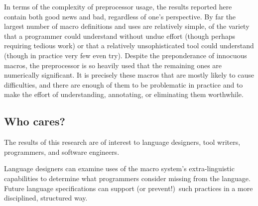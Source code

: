 \documentclass[11pt]{article}
\begin{document}
In terms of the complexity of preprocessor usage, the results reported here
contain both good news and bad, regardless of one's perspective.  By far
the largest number of macro definitions and uses are relatively simple, of
the variety that a programmer could understand without undue effort (though
perhaps requiring tedious work) or that a relatively unsophisticated tool
could understand (though in practice very few even try).  Despite the
preponderance of innocuous macros, the preprocessor is so heavily used that
the remaining ones are numerically significant.  It is precisely these
macros that are mostly likely to cause difficulties, and there are enough
of them to be problematic in practice and to make the effort of
understanding, annotating, or eliminating them worthwhile.




%


\subsection{Who cares?}

The results of this research are of interest to language designers, tool
writers, programmers, and software engineers.

Language designers can examine uses of the macro system's extra-linguistic
capabilities to determine what programmers consider missing from the
language.  Future language specifications can support (or prevent!)\ such
practices in a more disciplined, structured way.
\end{document}
